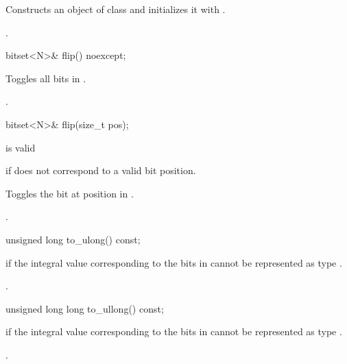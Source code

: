 \begin{itemdescr}
\pnum
\effects
Constructs an object  of class
and initializes it with
.

\pnum
\returns
{}.
\end{itemdescr}

%
\begin{itemdecl}
bitset<N>& flip() noexcept;
\end{itemdecl}

\begin{itemdescr}
\pnum
\effects
Toggles all bits in
.

\pnum
\returns
{}.
\end{itemdescr}

\begin{itemdecl}
bitset<N>& flip(size_t pos);
\end{itemdecl}

\begin{itemdescr}
\pnum
\requires
{} is valid

\pnum
\throws
{}
if  does not correspond to a valid bit position.%

\pnum
\effects
Toggles the bit at position  in
.

\pnum
\returns
{}.
\end{itemdescr}

%
\begin{itemdecl}
unsigned long to_ulong() const;
\end{itemdecl}

\begin{itemdescr}
\pnum
\throws
{}%
if the integral value  corresponding to the bits in
cannot be represented as type
.

\pnum
\returns
{}.
\end{itemdescr}

%
\begin{itemdecl}
unsigned long long to_ullong() const;
\end{itemdecl}

\begin{itemdescr}
\pnum
{}%
\throws
{}
if the integral value  corresponding to the bits in
cannot be represented as type
.

\pnum
\returns
{}.
\end{itemdescr}

